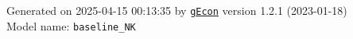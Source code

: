 \documentclass[10pt,a4paper]{article}
\numberwithin{equation}{section}
\begin{document}
\begin{landscape}
\begin{flushleft}{\large
Generated  on 2025-04-15 00:13:35 by \href{http://gecon.r-forge.r-project.org/}{\texttt{gEcon}} version 1.2.1 (2023-01-18)\\
Model name: \verb+baseline_NK+
}\end{flushleft}


\end{landscape}

\end{document}
